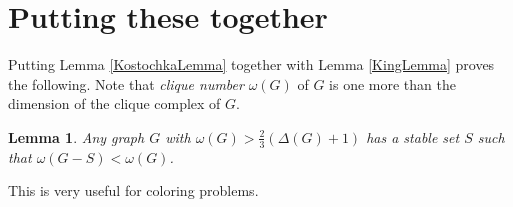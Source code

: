 \documentclass[12pt]{article}
\theoremstyle{plain}
\newtheorem{lem}[thm]{Lemma}
\theoremstyle{definition}
\theoremstyle{remark}
\newcommand{\parens}[1]{\left( #1 \right)}
\begin{document}
\section{Putting these together}

Putting Lemma \ref{KostochkaLemma} together with Lemma \ref{KingLemma} proves the following.  Note that \emph{clique number} $\omega(G)$ of $G$ is one more than the dimension of the clique complex of $G$.

\begin{lem}\label{Hitting}
Any graph $G$ with $\omega(G) > \frac23\parens{\Delta(G) + 1}$ has a stable set $S$ such that $\omega(G - S) < \omega(G)$.
\end{lem}

This is very useful for coloring problems.



\end{document}
